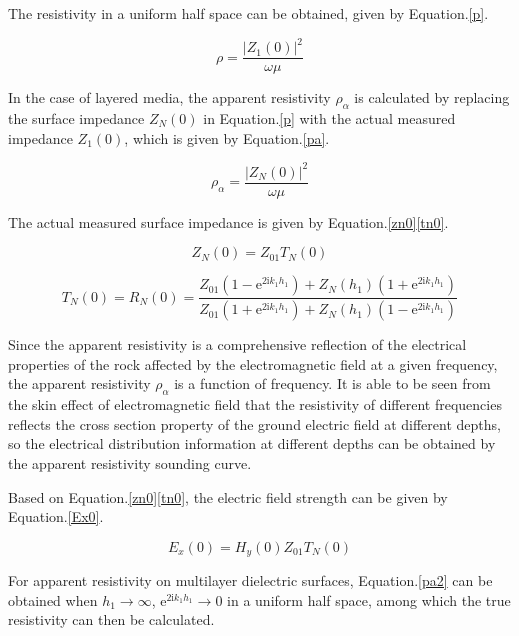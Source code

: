\documentclass[9pt,a4paper,twoside]{rho-class/rho}
\newcommand{\eu}{{\mathrm{e}}}
\newcommand{\iu}{{\mathrm{i}}}
\begin{document}
The resistivity in a uniform half space can be obtained, given by Equation.\eqref{p}.

\begin{equation}
    \label{p}
    \rho=\dfrac{|Z_1(0)|^2}{\omega \mu}
\end{equation}

In the case of layered media, the apparent resistivity $\rho_\alpha$ is calculated by replacing the surface impedance $Z_N(0)$ in Equation.\eqref{p} with the actual measured impedance $Z_1(0)$, which is given by Equation.\eqref{pa}.

\begin{equation}
    \label{pa}
    \rho_\alpha=\dfrac{|Z_N(0)|^2}{\omega \mu}
\end{equation}

The actual measured surface impedance is given by Equation.\eqref{zn0}\eqref{tn0}.

\begin{equation}
    \label{zn0}
    Z_N(0)=Z_{01}T_N(0)
\end{equation}

\begin{equation}
    \label{tn0}
    T_N(0)=R_N(0)=\dfrac{Z_{01}(1-\eu^{2\iu k_1h_1})+Z_N(h_1)(1+\eu^{2\iu k_1h_1})}{Z_{01}(1+\eu^{2\iu k_1h_1})+Z_N(h_1)(1-\eu^{2\iu k_1h_1})}
\end{equation}

Since the apparent resistivity is a comprehensive reflection of the electrical properties of the rock affected by the electromagnetic field at a given frequency, the apparent resistivity $\rho_\alpha$ is a function of frequency. It is able to be seen from the skin effect of electromagnetic field that the resistivity of different frequencies reflects the cross section property of the ground electric field at different depths, so the electrical distribution information at different depths can be obtained by the apparent resistivity sounding curve.

Based on Equation.\eqref{zn0}\eqref{tn0}, the electric field strength can be given by Equation.\eqref{Ex0}.

\begin{equation}
    \label{Ex0}
    E_x(0)=H_y(0)Z_{01}T_N(0)
\end{equation}

For apparent resistivity on multilayer dielectric surfaces, Equation.\eqref{pa2} can be obtained when $h_1\to \infty$, $\eu^{2\iu k_1h_1}\to 0$ in a uniform half space, among which the true resistivity can then be calculated. 
\end{document}
